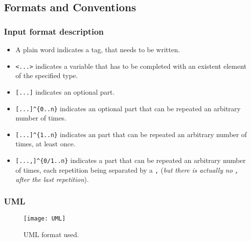 
\subsection{Formats and Conventions}

\subsubsection{Input format description}

\begin{itemize}
  \item A plain word indicates a tag, that needs to be written.
  \item \texttt{<...>} indicates a variable that has to be completed with an existent element of the specified type.
  \item \texttt{[...]} indicates an optional part.
  \item \texttt{[...]\^{}\{0..n\}} indicates an optional part that can be repeated an arbitrary number of times.
  \item \texttt{[...]\^{}\{1..n\}} indicates an part that can be repeated an arbitrary number of times, at least once.
  \item \texttt{[...,]\^{}\{0/1..n\}} indicates a part that can be repeated an arbitrary number of times, each repetition being separated by a \texttt{,} (\emph{but there is actually no \texttt{,} after the last repetition}).
\end{itemize}

\subsubsection{UML}

\begin{figure}[!h]
  \centering
  \texttt{[image: UML]}
  \caption{UML format used.}
  \label{fig:UML}
\end{figure}

